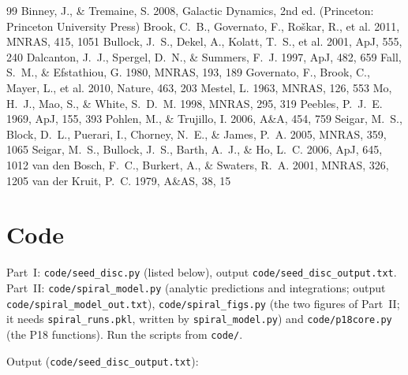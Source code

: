 \documentclass[11pt,a4paper]{article}
\begin{document}
\begin{thebibliography}{99}
 Binney, J., \& Tremaine, S. 2008, Galactic Dynamics, 2nd ed. (Princeton: Princeton University Press)
 Brook, C.~B., Governato, F., Ro\v{s}kar, R., et al. 2011, MNRAS, 415, 1051
 Bullock, J.~S., Dekel, A., Kolatt, T.~S., et al. 2001, ApJ, 555, 240
 Dalcanton, J.~J., Spergel, D.~N., \& Summers, F.~J. 1997, ApJ, 482, 659
 Fall, S.~M., \& Efstathiou, G. 1980, MNRAS, 193, 189
 Governato, F., Brook, C., Mayer, L., et al. 2010, Nature, 463, 203
 Mestel, L. 1963, MNRAS, 126, 553
 Mo, H.~J., Mao, S., \& White, S.~D.~M. 1998, MNRAS, 295, 319
 Peebles, P.~J.~E. 1969, ApJ, 155, 393
 Pohlen, M., \& Trujillo, I. 2006, A\&A, 454, 759
 Seigar, M.~S., Block, D.~L., Puerari, I., Chorney, N.~E., \& James, P.~A. 2005, MNRAS, 359, 1065
 Seigar, M.~S., Bullock, J.~S., Barth, A.~J., \& Ho, L.~C. 2006, ApJ, 645, 1012
 van den Bosch, F.~C., Burkert, A., \& Swaters, R.~A. 2001, MNRAS, 326, 1205
 van der Kruit, P.~C. 1979, A\&AS, 38, 15
\end{thebibliography}

\appendix
\section{Code}\label{app:code}
Part~I: \texttt{code/seed\_disc.py} (listed below), output
\texttt{code/seed\_disc\_output.txt}. Part~II: \texttt{code/spiral\_model.py}
(analytic predictions and integrations; output \texttt{code/spiral\_model\_out.txt}),
\texttt{code/spiral\_figs.py} (the two figures of Part~II; it needs
\texttt{spiral\_runs.pkl}, written by \texttt{spiral\_model.py}) and
\texttt{code/p18core.py} (the P18 functions). Run the scripts from \texttt{code/}.


\noindent Output (\texttt{code/seed\_disc\_output.txt}):

\end{document}
